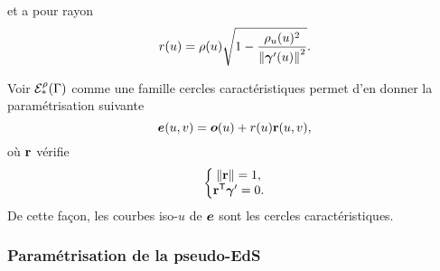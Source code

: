 et a pour rayon
\begin{equation}
    r(u) = \rho(u) \sqrt{1 - \frac{\rho_u(u)^2}{\left\| {\bm{\gamma}'(u)} \right\|^2}}.
    \label{eq:cercle_caracteristique_rayon}
\end{equation}
\par
Voir ${\mathcal{E}}_{*}^{\rho}({\Gamma})$ comme une famille cercles caractéristiques permet d'en donner la paramétrisation suivante
\begin{equation}
    \bm{e}(u,v) = \bm{o}(u) + r(u)\mathbf{r}(u,v),
    \label{eq:parametrisation_EdS_propre_courbe}
\end{equation}
où $\mathbf{r}$ vérifie
\begin{equation}
	\left\{
		\begin{matrix}
			\left\| {\mathbf{r}} \right\| = 1,\\ 
			{\mathbf{r}} ^\mathsf{T} {\bm{\gamma}'} = 0.
		\end{matrix}
	\right.
\end{equation}
De cette façon, les courbes iso-$u$ de $\bm{e}$ sont les cercles caractéristiques.


\subsubsection{Paramétrisation de la pseudo-EdS}
\label{section:parametrisation_pseudo_EdS_arete}
\newcommand{\Right}[1]{\lo{#1}}%
\newcommand{\Left}[1]{\hi{#1}}%



